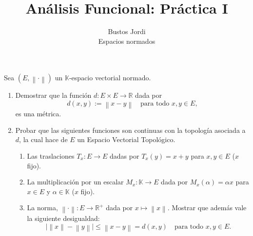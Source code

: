 \documentclass{article}
\theoremstyle{definition}
\newcommand{\R}{\mathbb{R}}
\newcommand{\K}{\mathbb{K}}
\newcommand{\norm}[1]{\left\lVert #1 \right\rVert}       %
\newcommand{\EN}[1][E]{(#1,\norm{\cdot})}                 %
\newenvironment{ejercicio}[1]{\begin{trivlist}
\item[\hskip \labelsep {\bfseries Ejercicio}\hskip \labelsep {\bfseries #1.}]}{\end{trivlist}}
\begin{document}
\title{Análisis Funcional: Práctica I}
\author{Bustos Jordi\\Espacios normados}

\maketitle

\begin{ejercicio}{1}
    Sea \( \EN \) un \( \K \)-espacio vectorial normado.
    \begin{enumerate}
        \item Demostrar que la función \( d:E\times E\to\R \) dada por
              \[
                  d(x,y):=\norm{x-y} \quad \text{para todo } x,y\in E,
              \]
              es una métrica.
        \item Probar que las siguientes funciones son continuas con la topología asociada a \(d\), la cual hace de \(E\) un Espacio Vectorial Topológico.
              \begin{enumerate}
                  \item Las traslaciones \(T_x:E\to E\) dadas por \(T_x(y)=x+y\) para \(x,y\in E\) (\(x\) fijo).
                  \item La multiplicación por un escalar \(M_x:\K\to E\) dada por \(M_x(\alpha)=\alpha x\) para \(x\in E\) y \( \alpha \in \K \) (\(x\) fijo).
                  \item La norma, \(\norm{\cdot}:E\to\R^+\) dada por \(x\mapsto \norm{x}\). Mostrar que además vale la siguiente desigualdad:
                        \[
                            \big|\norm{x}-\norm{y}\big|\leq\norm{x-y}=d(x,y) \quad \text{para todo } x,y\in E.
                        \]
              \end{enumerate}
    \end{enumerate}
\end{ejercicio}
\end{document}
